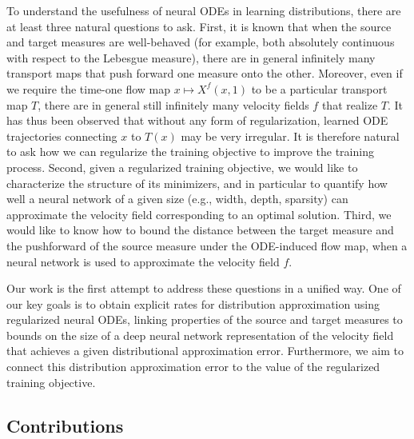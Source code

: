 

To understand the usefulness of neural ODEs in learning distributions, there are at least three natural questions to ask.
%
{First}, it is known that when the source and target measures are well-behaved (for example, both absolutely continuous with respect to the Lebesgue measure), there are in general infinitely many transport maps that push forward one measure onto the other. Moreover, even if we require the time-one flow map $x\mapsto X^f(x,1)$ to be a particular transport map $T$, there are in general still infinitely many velocity fields $f$ that realize $T$. It has thus been observed \citep{OTFlow,HowToTrain} that without any form of regularization, learned ODE trajectories connecting $x$ to $T(x)$ may be very irregular. It is therefore natural to ask how we can regularize the training objective to improve the training process.
%
{Second}, given a regularized training objective, we would like to characterize the structure of its minimizers, and in particular to quantify how well a neural network of a given size (e.g., width, depth, sparsity) can approximate the velocity field corresponding to an optimal solution. 
%
{Third}, we would like to know how to bound the distance between the target measure and the pushforward of the source measure under the ODE-induced flow map, when a neural network is used to approximate the velocity field $f$. 

Our work is the first attempt to address these questions in a unified way. One of our key goals is to obtain explicit rates for distribution approximation using regularized neural ODEs, linking properties of the source and target measures to bounds on the size of a deep neural network representation of the velocity field that achieves a given distributional approximation error. Furthermore, we aim to connect this distribution approximation error to the value of the regularized training objective.







\subsection{Contributions}

